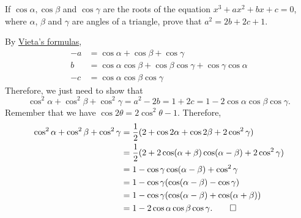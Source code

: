 \begin{question}
    If $\cos\alpha, \cos\beta$ and $\cos\gamma$ are the roots of the equation
    $x^3 + ax^2 + bx + c = 0$, where $\alpha$, $\beta$ and $\gamma$ are angles
    of a triangle, prove that $a^2 = 2b + 2c + 1$. 
\end{question}
\begin{solution}
    By \hyperref[thm: vieta]{Vieta's formulas},
    \begin{align*}
        -a &= \cos\alpha + \cos\beta + \cos\gamma\\
        b &= \cos\alpha \cos\beta + \cos\beta \cos\gamma + \cos\gamma \cos\alpha\\
        -c &= \cos\alpha \cos\beta \cos\gamma
    \end{align*}
    Therefore, we just need to show that
    \[ \cos^2\alpha + \cos^2\beta + \cos^2\gamma = a^2 - 2b = 1 + 2c = 1 -
    2\cos\alpha \cos\beta \cos\gamma. \]
    Remember that we have $\cos 2\theta = 2\cos^2\theta - 1$. Therefore,
    \begin{align*}
        \cos^2\alpha + \cos^2\beta + \cos^2\gamma &= \frac{1}{2}(2 + \cos 2\alpha + \cos 2\beta + 2\cos^2\gamma)\\
        &= \frac{1}{2}(2 + 2\cos(\alpha + \beta)\cos(\alpha - \beta) + 2\cos^2\gamma)\\
        &= 1 - \cos\gamma \cos(\alpha - \beta) + \cos^2 \gamma\\
        &= 1 - \cos\gamma(\cos(\alpha - \beta) - \cos \gamma)\\
        &= 1 - \cos\gamma(\cos(\alpha - \beta) + \cos(\alpha + \beta))\\
        &= 1 - 2\cos\alpha \cos\beta \cos\gamma. \qedhere
    \end{align*}
\end{solution}

